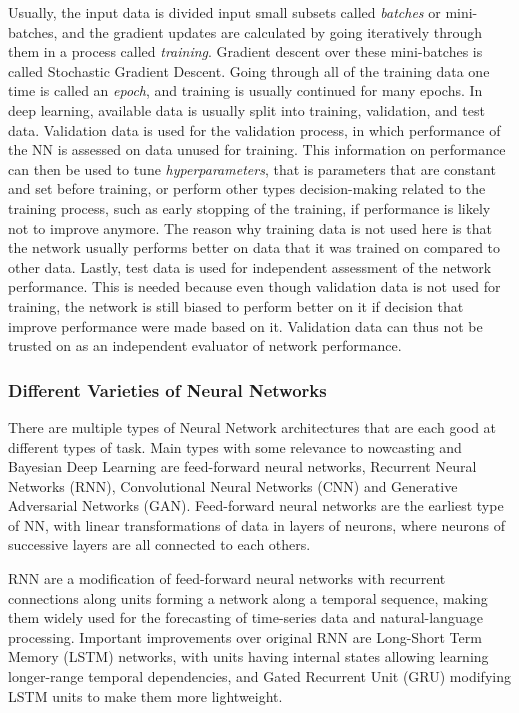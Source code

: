Usually, the input data is divided input small subsets called \textit{batches} or mini-batches, and the gradient updates are calculated by going iteratively through them in a process called \textit{training}. Gradient descent over these mini-batches is called Stochastic Gradient Descent. Going through all of the training data one time is called an \textit{epoch}, and training is usually continued for many epochs. In deep learning, available data is usually split into training, validation, and test data. Validation data is used for the validation process, in which performance of the NN is assessed on data unused for training. This information on performance can then be used to tune \textit{hyperparameters}, that is parameters that are constant and set before training, or perform other types decision-making related to the training process, such as early stopping of the training, if performance is likely not to improve anymore. The reason why training data is not used here is that the network usually performs better on data that it was trained on compared to other data. Lastly, test data is used for independent assessment of the network performance. This is needed because even though validation data is not used for training, the network is still biased to perform better on it if decision that improve performance were made based on it. Validation data can thus not be trusted on as an independent evaluator of network performance. 

\subsubsection*{Different Varieties of Neural Networks}
There are multiple types of Neural Network architectures that are each good at different types of task. Main types with some relevance to nowcasting and Bayesian Deep Learning are feed-forward neural networks, Recurrent Neural Networks (RNN), Convolutional Neural Networks (CNN) and Generative Adversarial Networks (GAN). Feed-forward neural networks are the earliest type of NN, with linear transformations of data in layers of neurons, where neurons of successive layers are all connected to each others.

 RNN are a modification of feed-forward neural networks with recurrent connections along units forming a network along a temporal sequence, making them widely used for the forecasting of time-series data and natural-language processing. Important improvements over original RNN are Long-Short Term Memory (LSTM) networks, with units having internal states allowing learning longer-range temporal dependencies, and Gated Recurrent Unit (GRU) modifying LSTM units to make them more lightweight. 

